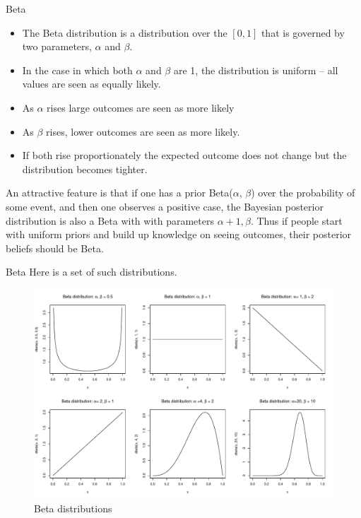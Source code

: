 \documentclass[
  11pt,
  ignorenonframetext,
]{beamer}
\providecommand{\tightlist}{%
  \setlength{\itemsep}{0pt}\setlength{\parskip}{0pt}}\usepackage{longtable,booktabs,array}
\begin{document}
\begin{frame}{Beta}
\protect\hypertarget{beta}{}
\begin{itemize}
\tightlist
\item
  The Beta distribution is a distribution over the \([0,1]\) that is
  governed by two parameters, \(\alpha\) and \(\beta\).
\item
  In the case in which both \(\alpha\) and \(\beta\) are 1, the
  distribution is uniform -- all values are seen as equally likely.
\item
  As \(\alpha\) rises large outcomes are seen as more likely
\item
  As \(\beta\) rises, lower outcomes are seen as more likely.
\item
  If both rise proportionately the expected outcome does not change but
  the distribution becomes tighter.
\end{itemize}

An attractive feature is that if one has a prior Beta(\(\alpha\),
\(\beta\)) over the probability of some event, and then one observes a
positive case, the Bayesian posterior distribution is also a Beta with
with parameters \(\alpha+1, \beta\). Thus if people start with uniform
priors and build up knowledge on seeing outcomes, their posterior
beliefs should be Beta.
\end{frame}

\begin{frame}{Beta}
\protect\hypertarget{beta-1}{}
Here is a set of such distributions.

\begin{figure}

{\centering \includegraphics{0_lectures_files/figure-beamer/Betas-1.pdf}

}

\caption{\label{betas} Beta distributions}

\end{figure}
\end{frame}
\end{document}
